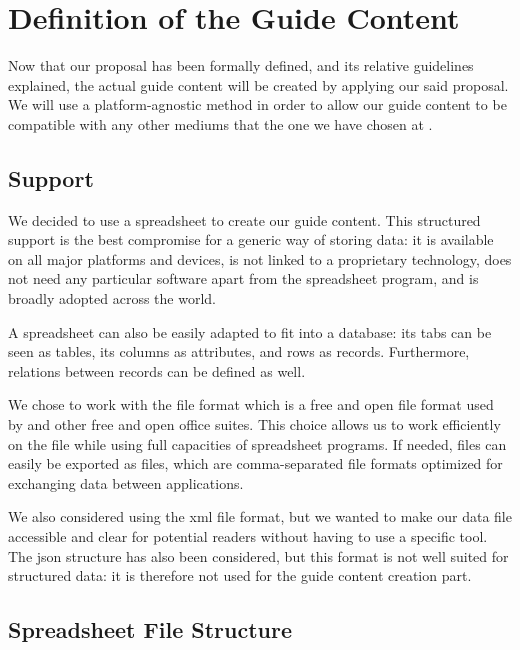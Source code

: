 \section{Definition of the Guide Content}
\label{sec:proposal_data}

Now that our proposal has been formally defined, and its relative guidelines explained, the actual guide content will be created by applying our said proposal. We will use a platform-agnostic method in order to allow our guide content to be compatible with any other mediums that the one we have chosen at .

\subsection{Support}
\label{subsec:proposal_data_support}

We decided to use a spreadsheet to create our guide content. This structured support is the best compromise for a generic way of storing data: it is available on all major platforms and devices, is not linked to a proprietary technology, does not need any particular software apart from the spreadsheet program, and is broadly adopted across the world. 

A spreadsheet can also be easily adapted to fit into a database: its tabs can be seen as tables, its columns as attributes, and rows as records. Furthermore, relations between records can be defined as well.

We chose to work with the  file format which is a free and open file format used by  and other free and open office suites. This choice allows us to work efficiently on the file while using full capacities of spreadsheet programs. If needed,  files can easily be exported as  files, which are comma-separated file formats optimized for exchanging data between applications.

We also considered using the \gls{xml} file format, but we wanted to make our data file accessible and clear for potential readers without having to use a specific tool. The \gls{json} structure has also been considered, but this format is not well suited for structured data: it is therefore not used for the guide content creation part.

\subsection{Spreadsheet File Structure}
\label{subsec:proposal_data_categories}

